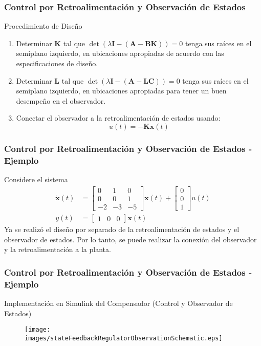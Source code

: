 \documentclass[aspectratio=169]{beamer}
\theoremstyle{definition}
\theoremstyle{plain}
\theoremstyle{remark}
\begin{document}
\begin{frame}[<+->]\frametitle{Control por Retroalimentación y Observación de Estados}
	Procedimiento de Diseño
	\begin{enumerate}
		\item Determinar $\mathbf{K}$ tal que $\det(\lambda \mathbf{I} - (\mathbf{A} - \mathbf{BK})) = 0$ tenga sus raíces en el semiplano izquierdo, en ubicaciones apropiadas de acuerdo con las especificaciones de diseño.
		\item Determinar $\mathbf{L}$ tal que $\det(\lambda \mathbf{I} - (\mathbf{A} - \mathbf{LC})) = 0$ tenga sus raíces en el semiplano izquierdo, en ubicaciones apropiadas para tener un buen desempeño en el observador.
		\item Conectar el observador a la retroalimentación de estados usando:
		\begin{equation*}
			u(t) = - \mathbf{K}\hat{\mathbf{x}}(t)
		\end{equation*}
	\end{enumerate}
\end{frame}

\begin{frame}[c]\frametitle{Control por Retroalimentación y Observación de Estados - Ejemplo}
	Considere el sistema	
	\begin{align*}
		\dot{\mathbf{x}}(t) &=
		\begin{bmatrix}
			0 & 1 & 0\\
			0 & 0 & 1\\
			-2 & -3 & -5
		\end{bmatrix}
		\mathbf{x}(t) +
		\begin{bmatrix}
			0 \\ 0 \\ 1
		\end{bmatrix}u(t)\\
		y(t) &=
		\begin{bmatrix}
			1 & 0 & 0
		\end{bmatrix}
		\mathbf{x}(t)
	\end{align*}
	Ya se realizó el diseño por separado de la retroalimentación de estados y el observador de estados. Por lo tanto, se puede realizar la conexión del observador y la retroalimentación a la planta.
\end{frame}

\begin{frame}[c]\frametitle{Control por Retroalimentación y Observación de Estados - Ejemplo}
	Implementación en Simulink del Compensador (Control y Observador de Estados)
	\begin{figure}
		\centering
		\texttt{[image: images/stateFeedbackRegulatorObservationSchematic.eps]}
	\end{figure}
\end{frame}
\end{document}
